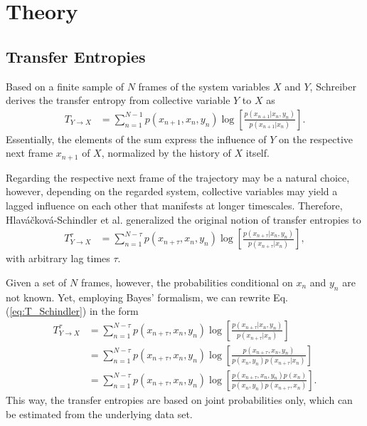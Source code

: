 \documentclass[12pt,a4paper,twoside,english,fleqn,preprint,aps,prb]{revtex4}
\begin{document}
\section{Theory}
\subsection{Transfer Entropies}
Based on a finite sample of $N$ frames of the system variables $X$ and $Y$,
Schreiber\cite{Schreiber2000} derives the transfer entropy from collective variable $Y$ to $X$ as
\begin{align}
  T_{Y \rightarrow X} &= \sum_{n=1}^{N-1} p(x_{n+1}, x_n, y_n) \log \left[\frac{p(x_{n+1} \vert x_n, y_n) }{ p(x_{n+1} \vert x_n)} \right]\label{eq:T_Schreiber}.
\end{align}
Essentially, the elements of the sum express the influence of $Y$ on the respective next frame $x_{n+1}$ of $X$, normalized by the history of $X$ itself.

Regarding the respective next frame of the trajectory may be a natural choice, however, depending on the regarded system,
collective variables may yield a lagged influence on each other that manifests at longer timescales.
Therefore, Hlaváčková-Schindler et al.\cite{Schindler2007} generalized the original notion of transfer entropies to
\begin{align}
    T_{Y \rightarrow X}^{\tau} &=
        \sum_{n=1}^{N-\tau} p(x_{n+\tau}, x_n, y_n) \log \left[\frac{p(x_{n+\tau} \vert x_n, y_n) }{ p(x_{n+\tau} \vert x_n)} \right]\label{eq:T_Schindler},
\end{align}
with arbitrary lag times $\tau$.

Given a set of $N$ frames, however, the probabilities conditional on $x_n$ and $y_n$ are not known.
Yet, employing Bayes' formalism, we can rewrite Eq. (\ref{eq:T_Schindler}) in the form
\begin{align}
  T_{Y \rightarrow X}^{\tau} &= \sum_{n=1}^{N-\tau} p(x_{n+\tau}, x_n, y_n) \log \left[\frac{p(x_{n+\tau} \vert x_n, y_n) }{ p(x_{n+\tau} \vert x_n)} \right]\nonumber\\
                             &= \sum_{n=1}^{N-\tau} p(x_{n+\tau}, x_n, y_n) \log \left[\frac{p(x_{n+\tau}, x_n, y_n)}{p(x_n, y_n) p(x_{n+\tau} \vert x_n)} \right]\nonumber\\
                             &= \sum_{n=1}^{N-\tau} p(x_{n+\tau}, x_n, y_n) \log \left[\frac{p(x_{n+\tau}, x_n, y_n) p(x_n)}{p(x_n, y_n) p(x_{n+\tau}, x_n)} \right].\label{eq:T}
\end{align}
This way, the transfer entropies are based on joint probabilities only, which can be estimated from the underlying data set.
\end{document}
